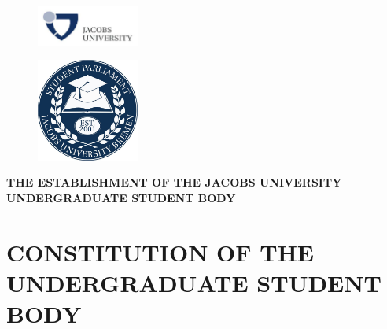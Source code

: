 \documentclass[12pt]{../misc/constitution}
\begin{document}


\begin{figure}[H]
    \centering
    \includegraphics[width=0.3\textwidth, right]{../misc/jacobs.png}
\end{figure}

\begin{figure}[H]
    \centering
    \includegraphics[width=0.3\textwidth]{../misc/usg.jpg}
\end{figure}

\begin{center}
\textbf{\Large{THE ESTABLISHMENT OF THE JACOBS UNIVERSITY\\
UNDERGRADUATE STUDENT BODY}}
\end{center}

\begingroup
\let\clearpage\relax
\setcounter{tocdepth}{2}

\renewcommand{\contentsname}{\centering Table of Contents}

\begin{multicols}{2}
\tableofcontents
\end{multicols}
\endgroup

\newpage


\linenumbers
{}
\setcounter{page}{1}




\part{CONSTITUTION OF THE UNDERGRADUATE STUDENT BODY}
\end{document}
